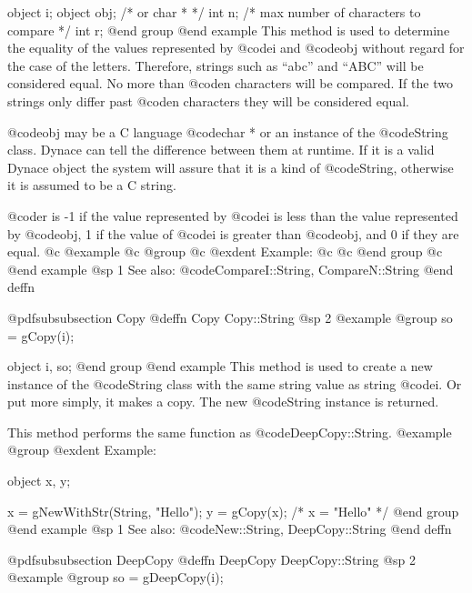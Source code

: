 object  i;
object  obj;  /*  or char *  */
int     n;    /*  max number of characters to compare  */
int     r;
@end group
@end example
This method is used to determine the equality of the values represented
by @code{i} and @code{obj} without regard for the case of the letters.
Therefore, strings such as ``abc'' and ``ABC'' will be considered equal.
No more than @code{n} characters will be compared.  If the two strings
only differ past @code{n} characters they will be considered equal.

@code{obj} may be a C language @code{char *} or an instance of the
@code{String} class.  Dynace can tell the difference between them at
runtime.  If it is a valid Dynace object the system will assure that it is
a kind of @code{String}, otherwise it is assumed to be a C string.

@code{r} is -1 if the value represented by @code{i} is less than the
value represented by @code{obj}, 1 if the value of @code{i} is greater
than @code{obj}, and 0 if they are equal.
@c @example
@c @group
@c @exdent Example:
@c
@c @end group
@c @end example
@sp 1
See also:  @code{CompareI::String, CompareN::String}
@end deffn














@pdfsubsubsection {Copy}
@deffn {Copy} Copy::String
@sp 2
@example
@group
so = gCopy(i);

object  i, so;
@end group
@end example
This method is used to create a new instance of the @code{String} class
with the same string value as string @code{i}.  Or put more simply,
it makes a copy.  The new @code{String} instance is returned.

This method performs the same function as @code{DeepCopy::String}.
@example
@group
@exdent Example:

object  x, y;

x = gNewWithStr(String, "Hello");
y = gCopy(x);
/*  x = "Hello"  */
@end group
@end example
@sp 1
See also:  @code{New::String, DeepCopy::String}
@end deffn













@pdfsubsubsection {DeepCopy}
@deffn {DeepCopy} DeepCopy::String
@sp 2
@example
@group
so = gDeepCopy(i);


